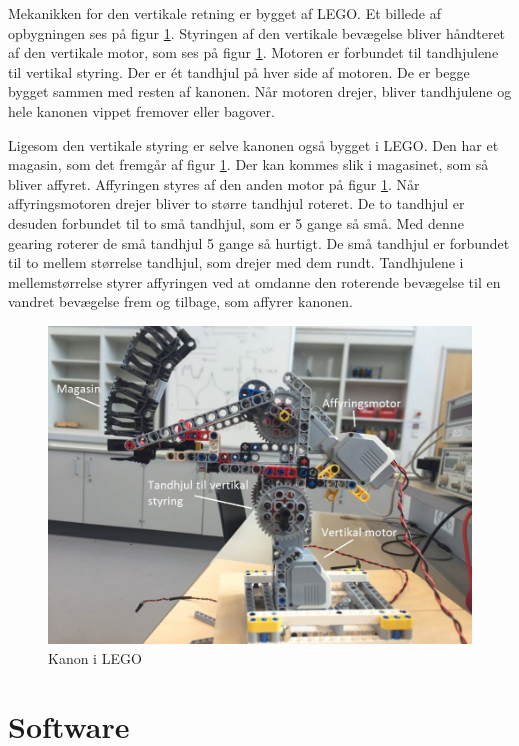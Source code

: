 Mekanikken for den vertikale retning er bygget af LEGO. Et billede af opbygningen ses på figur \ref{fig:kanon}. Styringen af den vertikale bevægelse bliver håndteret af den vertikale motor, som ses på figur \ref{fig:kanon}. Motoren er forbundet til tandhjulene til vertikal styring. Der er ét tandhjul på hver side af motoren. De er begge bygget sammen med resten af kanonen. Når motoren drejer, bliver tandhjulene og hele kanonen vippet fremover eller bagover. 

Ligesom den vertikale styring er selve kanonen også bygget i LEGO. Den har et magasin, som det fremgår af figur \ref{fig:kanon}. Der kan kommes slik i magasinet, som så bliver affyret. Affyringen styres af den anden motor på figur \ref{fig:kanon}. Når affyringsmotoren drejer bliver to større tandhjul roteret. De to tandhjul er desuden forbundet til to små tandhjul, som er 5 gange så små. Med denne gearing roterer de små tandhjul 5 gange så hurtigt. De små tandhjul er forbundet til to mellem størrelse tandhjul, som drejer med dem rundt. Tandhjulene i mellemstørrelse styrer affyringen ved at omdanne den roterende bevægelse til en vandret bevægelse frem og tilbage, som affyrer kanonen.

\begin{figure}[H]
	\centering
	\includegraphics[width=1\textwidth]{Afsnit/DesignOgImplementering/images/kanon}
	\caption{Kanon i LEGO}
	\label{fig:kanon}
\end{figure}
 

\section{Software}

